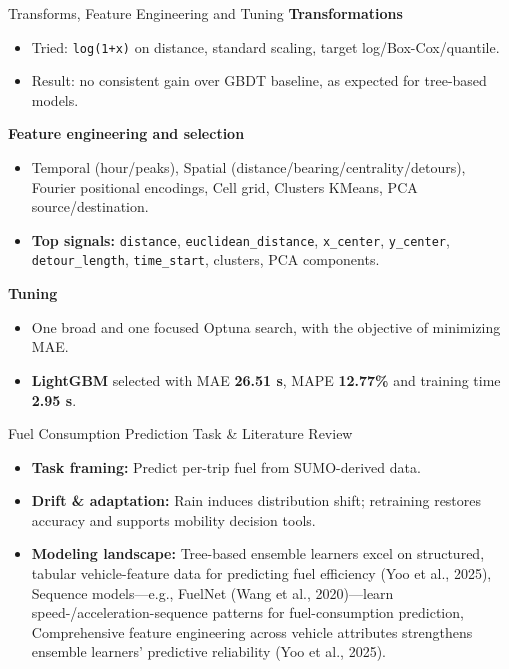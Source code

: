 \documentclass[aspectratio=169,11pt]{beamer}
\begin{document}
\begin{frame}{Transforms, Feature Engineering and Tuning}
    \textbf{Transformations}
    \begin{itemize}
        \item Tried: \texttt{log(1+x)} on distance, standard scaling, target log/Box-Cox/quantile.
        \item Result: no consistent gain over GBDT baseline, as expected for tree-based models.
    \end{itemize}

    \textbf{Feature engineering and selection}
    \begin{itemize}
        \item Temporal (hour/peaks), Spatial (distance/bearing/centrality/detours), Fourier positional encodings, Cell grid, Clusters KMeans, PCA source/destination.
        \item \textbf{Top signals:} \texttt{distance}, \texttt{euclidean\_distance}, \texttt{x\_center}, \texttt{y\_center}, \texttt{detour\_length}, \texttt{time\_start}, clusters, PCA components.
    \end{itemize}

    \textbf{Tuning}
    \begin{itemize}
        \item One broad and one focused Optuna search, with the objective of minimizing MAE.
        \item \textbf{LightGBM} selected with MAE \textbf{26.51 s}, MAPE \textbf{12.77\%} and training time \textbf{2.95 s}.
    \end{itemize}
\end{frame}

\begin{frame}{Fuel Consumption Prediction Task \& Literature Review}
    \begin{itemize}
        \item \textbf{Task framing:} Predict per-trip fuel from SUMO-derived data.
        \item \textbf{Drift \& adaptation:} Rain induces distribution shift; retraining restores accuracy and supports mobility decision tools.
        \item \textbf{Modeling landscape:} Tree-based ensemble learners excel on structured, tabular vehicle-feature data for predicting fuel efficiency (Yoo et al., 2025), Sequence models—e.g., FuelNet (Wang et al., 2020)—learn speed-/acceleration-sequence patterns for fuel-consumption prediction, Comprehensive feature engineering across vehicle attributes strengthens ensemble learners’ predictive reliability (Yoo et al., 2025).
    \end{itemize}
\end{frame}
\end{document}

